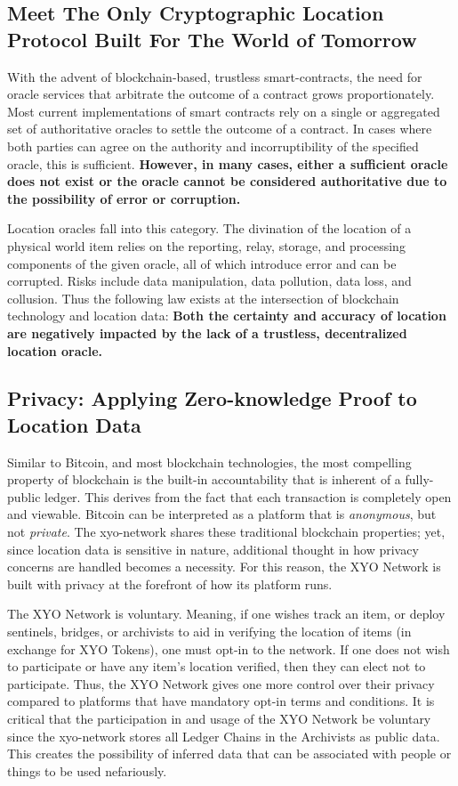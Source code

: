\documentclass{article}
\begin{document}
\subsection {Meet The Only Cryptographic Location Protocol Built For The World of Tomorrow}
With the advent of blockchain-based, \gls{trustless} \glspl{smart-contract}, the need for \gls{oracle} services that arbitrate the outcome of a contract grows proportionately. Most current implementations of smart contracts rely on a single or aggregated set of authoritative oracles to settle the outcome of a contract. In cases where both parties can agree on the authority and incorruptibility of the specified oracle, this is sufficient. \textbf{However, in many cases, either a sufficient oracle does not exist or the oracle cannot be considered authoritative due to the possibility of error or corruption.}

Location oracles fall into this category. The divination of the location of a physical world item relies on the reporting, relay, storage, and processing components of the given oracle, all of which introduce error and can be corrupted. Risks include data manipulation, data pollution, data loss, and collusion. Thus the following law exists at the intersection of blockchain technology and location data: \textbf{Both the \gls{certainty} and \gls{accuracy} of location are negatively impacted by the lack of a \gls{trustless}, decentralized location oracle.}

\subsection{Privacy: Applying Zero-knowledge Proof to Location Data}

Similar to Bitcoin, and most blockchain technologies, the most compelling property of blockchain is the built-in accountability that is inherent of a fully-public ledger. This derives from the fact that each transaction is completely open and viewable. Bitcoin can be interpreted as a platform that is \textit{anonymous}, but not \textit{private}. The \Gls{xyo-network} shares these traditional blockchain properties; yet, since location data is sensitive in nature, additional thought in how privacy concerns are handled becomes a necessity. For this reason, the XYO Network is built with privacy at the forefront of how its platform runs.

The XYO Network is voluntary. Meaning, if one wishes track an item, or deploy \Glspl{sentinel}, \Glspl{bridge}, or \Glspl{archivist} to aid in verifying the location of items (in exchange for XYO Tokens), one must opt-in to the network. If one does not wish to participate or have any item's location verified, then they can elect not to participate. Thus, the XYO Network gives one more control over their privacy compared to platforms that have mandatory opt-in terms and conditions. It is critical that the participation in and usage of the XYO Network be voluntary since the \Gls{xyo-network} stores all Ledger Chains in the Archivists as public data. This creates the possibility of inferred data that can be associated with people or things to be used nefariously.
\end{document}
